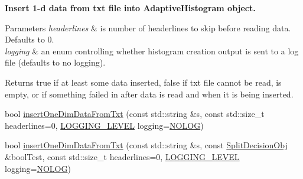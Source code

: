 \begin{Indent}{\bf \-Insert 1-\/d data from txt file into \-Adaptive\-Histogram object.}
{\begin{DoxyParams}{\-Parameters}
{\em headerlines} & is number of headerlines to skip before reading data. \-Defaults to 0. \\
\hline
{\em logging} & an enum controlling whether histogram creation output is sent to a log file (defaults to no logging). \\
\hline
\end{DoxyParams}
\begin{DoxyReturn}{\-Returns}
true if at least some data inserted, false if txt file cannot be read, is empty, or if something failed in after data is read and when it is being inserted. 
\end{DoxyReturn}
}\begin{DoxyCompactItemize}
\item 
bool \hyperlink{classsubpavings_1_1AdaptiveHistogram_a11051ee818f2d6fb2631573e47ed73b8}{insert\-One\-Dim\-Data\-From\-Txt} (const std\-::string \&s, const std\-::size\-\_\-t headerlines=0, \hyperlink{namespacesubpavings_aef8e51096b59ecaf1a1e9b2ee24b6089}{\-L\-O\-G\-G\-I\-N\-G\-\_\-\-L\-E\-V\-E\-L} logging=\hyperlink{namespacesubpavings_aef8e51096b59ecaf1a1e9b2ee24b6089a1e5eba048e2496b2450d63fc2e9d1737}{\-N\-O\-L\-O\-G})
\item 
bool \hyperlink{classsubpavings_1_1AdaptiveHistogram_aef10187eeb8d449b8692c355960aefe0}{insert\-One\-Dim\-Data\-From\-Txt} (const std\-::string \&s, const \hyperlink{classsubpavings_1_1SplitDecisionObj}{\-Split\-Decision\-Obj} \&bool\-Test, const std\-::size\-\_\-t headerlines=0, \hyperlink{namespacesubpavings_aef8e51096b59ecaf1a1e9b2ee24b6089}{\-L\-O\-G\-G\-I\-N\-G\-\_\-\-L\-E\-V\-E\-L} logging=\hyperlink{namespacesubpavings_aef8e51096b59ecaf1a1e9b2ee24b6089a1e5eba048e2496b2450d63fc2e9d1737}{\-N\-O\-L\-O\-G})
\end{DoxyCompactItemize}
\end{Indent}
